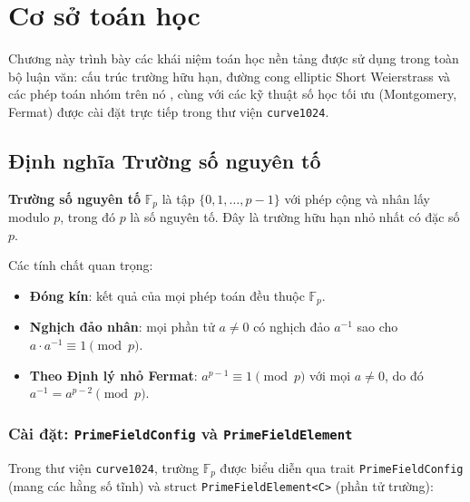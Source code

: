 
\clearpage
{}

\setcounter{chapter}{1}
\chapter[Cơ sở toán học]{Cơ sở toán học}

Chương này trình bày các khái niệm toán học nền tảng được sử dụng trong
toàn bộ luận văn: cấu trúc trường hữu hạn, đường cong elliptic Short
Weierstrass và các phép toán nhóm trên nó
\citep{Silverman2009, Washington2008}, cùng với các kỹ thuật số học tối
ưu (Montgomery, Fermat) được cài đặt trực tiếp trong thư viện
\texttt{curve1024}.

\section{Định nghĩa Trường số nguyên
tố}\label{ux111ux1ecbnh-nghux129a-trux1b0ux1eddng-sux1ed1-nguyuxean-tux1ed1}

\textbf{Trường số nguyên tố} \(\mathbb{F}_p\) là tập
\(\{0, 1, \ldots, p-1\}\) với phép cộng và nhân lấy modulo \(p\), trong
đó \(p\) là số nguyên tố. Đây là trường hữu hạn nhỏ nhất có đặc số
\(p\).

Các tính chất quan trọng:

\begin{itemize}
\tightlist
\item
  \textbf{Đóng kín}: kết quả của mọi phép toán đều thuộc
  \(\mathbb{F}_p\).
\item
  \textbf{Nghịch đảo nhân}: mọi phần tử \(a \neq 0\) có nghịch đảo
  \(a^{-1}\) sao cho \(a \cdot a^{-1} \equiv 1 \pmod{p}\).
\item
  \textbf{Theo Định lý nhỏ Fermat}: \(a^{p-1} \equiv 1 \pmod{p}\) với
  mọi \(a \neq 0\), do đó \(a^{-1} = a^{p-2} \pmod{p}\).
\end{itemize}

\subsection{\texorpdfstring{Cài đặt: \texttt{PrimeFieldConfig} và
\texttt{PrimeFieldElement}}{Cài đặt: PrimeFieldConfig và PrimeFieldElement}}\label{cuxe0i-ux111ux1eb7t-primefieldconfig-vuxe0-primefieldelement}

Trong thư viện \texttt{curve1024}, trường \(\mathbb{F}_p\) được biểu
diễn qua trait \texttt{PrimeFieldConfig} (mang các hằng số tĩnh) và
struct \texttt{PrimeFieldElement\textless{}C\textgreater{}} (phần tử
trường):

